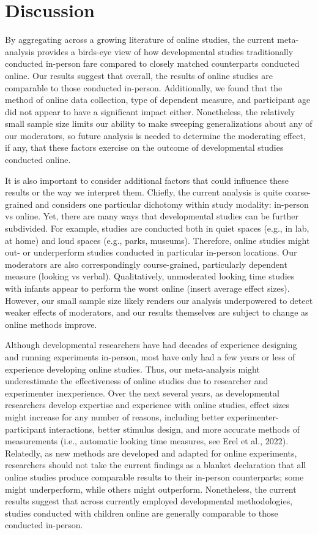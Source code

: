 \documentclass[
  man,floatsintext]{apa6}
\begin{document}
\hypertarget{discussion}{%
\section{Discussion}\label{discussion}}

By aggregating across a growing literature of online studies, the current meta-analysis provides a birds-eye view of how developmental studies traditionally conducted in-person fare compared to closely matched counterparts conducted online. Our results suggest that overall, the results of online studies are comparable to those conducted in-person. Additionally, we found that the method of online data collection, type of dependent measure, and participant age did not appear to have a significant impact either. Nonetheless, the relatively small sample size limits our ability to make sweeping generalizations about any of our moderators, so future analysis is needed to determine the moderating effect, if any, that these factors exercise on the outcome of developmental studies conducted online.

It is also important to consider additional factors that could influence these results or the way we interpret them. Chiefly, the current analysis is quite coarse-grained and considers one particular dichotomy within study modality: in-person vs online. Yet, there are many ways that developmental studies can be further subdivided. For example, studies are conducted both in quiet spaces (e.g., in lab, at home) and loud spaces (e.g., parks, museums). Therefore, online studies might out- or underperform studies conducted in particular in-person locations. Our moderators are also correspondingly course-grained, particularly dependent measure (looking vs verbal). Qualitatively, unmoderated looking time studies with infants appear to perform the worst online (insert average effect sizes). However, our small sample size likely renders our analysis underpowered to detect weaker effects of moderators, and our results themselves are subject to change as online methods improve.

Although developmental researchers have had decades of experience designing and running experiments in-person, most have only had a few years or less of experience developing online studies. Thus, our meta-analysis might underestimate the effectiveness of online studies due to researcher and experimenter inexperience. Over the next several years, as developmental researchers develop expertise and experience with online studies, effect sizes might increase for any number of reasons, including better experimenter-participant interactions, better stimulus design, and more accurate methods of measurements (i.e., automatic looking time measures, see Erel et al., 2022). Relatedly, as new methods are developed and adapted for online experiments, researchers should not take the current findings as a blanket declaration that all online studies produce comparable results to their in-person counterparts; some might underperform, while others might outperform. Nonetheless, the current results suggest that across currently employed developmental methodologies, studies conducted with children online are generally comparable to those conducted in-person.
\end{document}
